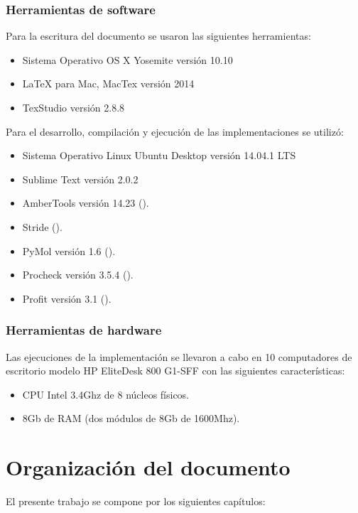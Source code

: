 \subsubsection{Herramientas de software}
Para la escritura del documento se usaron las siguientes herramientas:
\begin{itemize}
	\item Sistema Operativo OS X Yosemite versión 10.10
	\item LaTeX para Mac, MacTex versión 2014
	\item TexStudio versión 2.8.8
\end{itemize}

Para el desarrollo, compilación y ejecución de las implementaciones se utilizó:

\begin{itemize}
	\item Sistema Operativo Linux Ubuntu Desktop versión 14.04.1 LTS
	\item Sublime Text versión 2.0.2
	\item AmberTools versión 14.23 (\citealp{amber14}).
	\item Stride (\citealp{Heinig01072004}).
	\item PyMol versión 1.6 (\citealp{pymol}).
	\item Procheck versión 3.5.4 (\citealp{procheck}).
	\item Profit versión 3.1 (\citealp{profit}).
\end{itemize}

\subsubsection{Herramientas de hardware}
Las ejecuciones de la implementación se llevaron a cabo en 10 computadores de escritorio modelo HP EliteDesk 800 G1-SFF con las siguientes características:

\begin{itemize}
	\item CPU Intel 3.4Ghz de 8 núcleos físicos.
	\item 8Gb de RAM (dos módulos de 8Gb de 1600Mhz).
\end{itemize}

\section{Organizaci\'on del documento}
\label{intro:organizacion}

El presente trabajo se compone por los siguientes capítulos:

